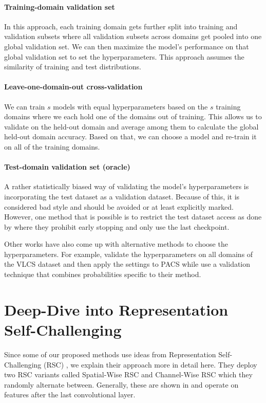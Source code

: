 \paragraph{Training-domain validation set} 
In this approach, each training domain gets further split into training and validation subsets where all validation subsets across domains get pooled into one global validation set. We can then maximize the model's performance on that global validation set to set the hyperparameters. This approach assumes the similarity of training and test distributions.

\paragraph{Leave-one-domain-out cross-validation}
We can train $s$ models with equal hyperparameters based on the $s$ training domains where we each hold one of the domains out of training. This allows us to validate on the held-out domain and average among them to calculate the global held-out domain accuracy. Based on that, we can choose a model and re-train it on all of the training domains. 

\paragraph{Test-domain validation set (oracle)}
A rather statistically biased way of validating the model's hyperparameters is incorporating the test dataset as a validation dataset. Because of this, it is considered bad style and should be avoided or at least explicitly marked. However, one method that is possible is to restrict the test dataset access as done by \citet{gulrajani2020search} where they prohibit early stopping and only use the last checkpoint.   

Other works have also come up with alternative methods to choose the hyperparameters. For example, \citet{krueger2020outofdistribution} validate the hyperparameters on all domains of the VLCS dataset and then apply the settings to PACS while \citet{DInnocenteC18} use a validation technique that combines probabilities specific to their method. 

\section{Deep-Dive into Representation Self-Challenging}
\label{sec:RSC}
Since some of our proposed methods use ideas from Representation Self-Challenging (RSC) \citep{huang2020selfchallenging}, we explain their approach more in detail here. They deploy two RSC variants called Spatial-Wise RSC and Channel-Wise RSC which they randomly alternate between. Generally, these are shown in  and operate on features after the last convolutional layer. 

